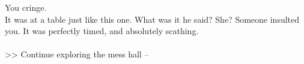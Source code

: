 You cringe.\\

It was at a table just like this one. What was it he said? She? Someone insulted you. It was perfectly timed, and absolutely scathing.\\
\\

>> Continue exploring the mess hall -- 